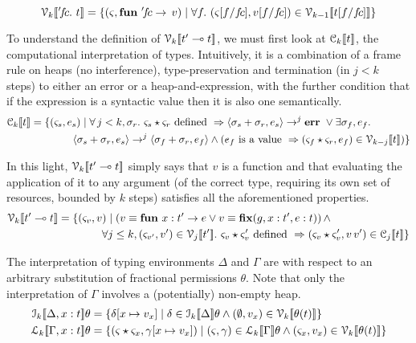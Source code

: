 \vspace{-\baselineskip}
\[
    \V{k}{ '\!f\!c.\  t } = \{ (\varsigma, \ottkw{fun}\ '\!f\!c \rightarrow \, v) \mid \forall f.\ (\varsigma [f / f\!c], v [f / f\!c]) \in \V{k-1}{ t [f / f\!c] } \}
\]

To understand the definition of $\mathcal{V}_{k} [\![ t' \multimap t ]\!]$, we must first look at
$\mathcal{C}_{k} [\![ t ]\!]$, the computational interpretation of types. Intuitively, it is a
combination of a frame rule on heaps (no interference), type-preservation and
termination (in $j < k$ steps) to either an error or a heap-and-expression,
with the further condition that if the expression is a syntactic value then it
is also one semantically.
\begin{align*}
    \mathcal{C}_{k} [\![  t  ]\!] &= \{ (\varsigma_s, e_s) \mid \forall \, j < k, \sigma_r.\ \varsigma_s \star \varsigma_r \textrm{ defined } \Rightarrow \langle \sigma_s + \sigma_r, e_s \rangle \rightarrow^j \mathbf{err}\ \vee \exists \sigma_f, e_f.\\
               & \qquad \qquad \langle \sigma_s + \sigma_r, e_s \rangle \rightarrow^j \langle \sigma_f + \sigma_r, e_f \rangle \wedge ( e_f \textrm { is a value } \Rightarrow ( \varsigma_f \star \varsigma_r, e_f ) \in \mathcal{V}_{k-j} [\![ t ]\!] ) \}
\end{align*}

In this light, $\mathcal{V}_{k} [\![ t' \multimap t ]\!]$ simply says
that $v$ is a function and that evaluating the application of it to any
argument (of the correct type, requiring its own set of resources, bounded by
$k$ steps) satisfies all the aforementioned properties.
\begin{align*}
    \mathcal{V}_{k} [\![  t' \multimap t  ]\!] &= \{ (\varsigma_v, v ) \mid ( v \equiv \mathbf{fun}\ x : t' \rightarrow e \vee v \equiv \mathbf{fix} (g, x : t' , e : t) ) \, \wedge\\
                            & \qquad \qquad \forall j \leq k, (\varsigma_{v'}, v') \in \mathcal{V}_{j} [\![  t'  ]\!].\ \varsigma_v \star \varsigma_v' \textrm{ defined } \Rightarrow (\varsigma_v \star \varsigma_v', v\, v') \in \mathcal{C}_{j} [\![ t ]\!] \}
\end{align*}

The interpretation of typing environments $\Delta$ and $\Gamma$ are with
respect to an arbitrary substitution of fractional permissions $\theta$. Note
that only the interpretation of $\Gamma$ involves a (potentially) non-empty heap.
\begin{align*}
    \den{I}{k}{ \Delta, x : t } \theta &= \{ \delta[x \mapsto v_x] \mid \delta \in \den{I}{k}{\Delta}\theta \wedge (\empH, v_x) \in \V{k}{\theta(t)} \} \\
    \den{L}{k}{ \Gamma, x : t } \theta &= \{ (\varsigma \star \varsigma_x, \gamma[x \mapsto v_x]) \mid (\varsigma, \gamma) \in \den{L}{k}{\Gamma}\theta \wedge (\varsigma_x, v_x) \in \V{k}{\theta(t)} \}
\end{align*}

